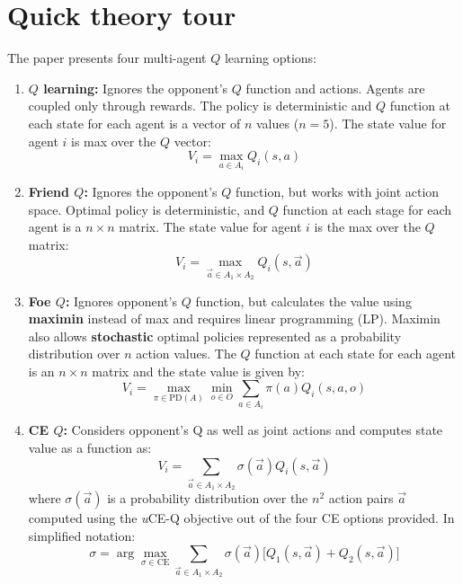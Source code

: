 \documentclass[conference]{IEEEtran}
\begin{document}
\section{Quick theory tour}
The paper presents four multi-agent $Q$ learning options:
\begin{enumerate}
\item {\bf $Q$ learning:} Ignores the opponent's $Q$ function and actions. Agents are coupled only through rewards. The policy is deterministic and $Q$ function at each state for each agent is a vector of $n$ values ($n=5$). The state value for agent $i$ is max over the $Q$ vector: 
\begin{equation}
V_i =\max_{a\in A_i} Q_i(s,a)
\end{equation} 
%
\item {\bf Friend $Q$: } Ignores the opponent's $Q$ function, but works with joint action space. Optimal policy is deterministic, and $Q$ function at each stage for each agent is a $n\times n$ matrix. The state value for agent $i$ is the max over the $Q$ matrix:
\begin{equation}
V_i = \max_{\vec{a}\in A_1\times A_2} Q_i(s, \vec{a})
\end{equation}
%
\item {\bf Foe $Q$: } Ignores opponent's $Q$ function, but calculates the value using {\bf maximin} instead of  max and requires linear programming (LP). Maximin also allows {\bf stochastic} optimal policies represented as a probability distribution over $n$ action values. The $Q$ function at each state for each agent is an $n\times n$ matrix and the state value is given by: 
%
\begin{equation}
V_i = \max_{\pi\in\text{PD}(A)}\min_{o\in O}\sum_{a\in A_i}\pi(a) Q_i(s, a, o)
\end{equation}
%
\item {\bf CE $Q$: } Considers opponent's Q as well as joint actions and computes state value as a function as:
%
\begin{equation}
V_i = \sum_{\vec{a}\in A_1\times A_2} \sigma(\vec{a})Q_i(s, \vec{a})
\end{equation}
where $\sigma(\vec{a})$ is a probability distribution over the $n^2$ action pairs $\vec{a}$ computed using the {\em u}CE-Q objective out of the four CE options provided. In simplified notation:
\begin{equation}
\sigma = \arg \max_{\sigma\in\text{CE}} \sum_{\vec{a}\in A_1 \times A_2} \sigma(\vec{a})\big[Q_1(s, \vec{a}) + Q_2(s, \vec{a})\big]
\end{equation}
\end{enumerate}
\end{document}
